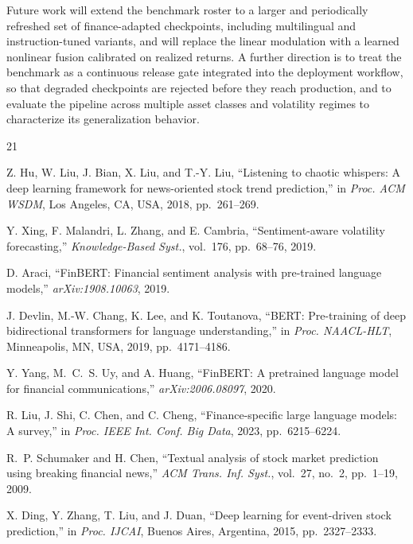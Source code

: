 \documentclass[conference]{IEEEtran}
\begin{document}
Future work will extend the benchmark roster to a larger and periodically
refreshed set of finance-adapted checkpoints, including multilingual and
instruction-tuned variants, and will replace the linear modulation with a
learned nonlinear fusion calibrated on realized returns. A further direction
is to treat the benchmark as a continuous release gate integrated into the
deployment workflow, so that degraded checkpoints are rejected before they
reach production, and to evaluate the pipeline across multiple asset classes
and volatility regimes to characterize its generalization behavior.


\begin{thebibliography}{21}

Z. Hu, W. Liu, J. Bian, X. Liu, and T.-Y. Liu,
``Listening to chaotic whispers: A deep learning framework for news-oriented
stock trend prediction,''
in \textit{Proc. ACM WSDM}, Los Angeles, CA, USA, 2018, pp.~261--269.

Y. Xing, F. Malandri, L. Zhang, and E. Cambria,
``Sentiment-aware volatility forecasting,''
\textit{Knowledge-Based Syst.}, vol.~176, pp.~68--76, 2019.

D. Araci,
``FinBERT: Financial sentiment analysis with pre-trained language models,''
\textit{arXiv:1908.10063}, 2019.

J. Devlin, M.-W. Chang, K. Lee, and K. Toutanova,
``BERT: Pre-training of deep bidirectional transformers for language
understanding,''
in \textit{Proc. NAACL-HLT}, Minneapolis, MN, USA, 2019, pp.~4171--4186.

Y. Yang, M.~C.~S. Uy, and A. Huang,
``FinBERT: A pretrained language model for financial communications,''
\textit{arXiv:2006.08097}, 2020.

R. Liu, J. Shi, C. Chen, and C. Cheng,
``Finance-specific large language models: A survey,''
in \textit{Proc. IEEE Int. Conf. Big Data}, 2023, pp.~6215--6224.

R.~P. Schumaker and H. Chen,
``Textual analysis of stock market prediction using breaking financial news,''
\textit{ACM Trans. Inf. Syst.}, vol.~27, no.~2, pp.~1--19, 2009.

X. Ding, Y. Zhang, T. Liu, and J. Duan,
``Deep learning for event-driven stock prediction,''
in \textit{Proc. IJCAI}, Buenos Aires, Argentina, 2015, pp.~2327--2333.


\end{thebibliography}
\end{document}
